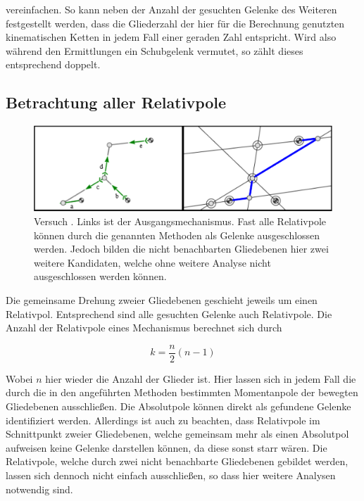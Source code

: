 vereinfachen.
So kann neben der Anzahl der gesuchten Gelenke des Weiteren festgestellt werden, dass die Gliederzahl der hier für die Berechnung genutzten kinematischen Ketten in jedem Fall einer geraden Zahl entspricht.
Wird also während den Ermittlungen ein Schubgelenk vermutet, so zählt dieses entsprechend doppelt.

\subsection{Betrachtung aller Relativpole}

\begin{figure}
    \includegraphics[width=\textwidth]{gfx/gruppe4_3_edit.png}
    \caption[Versuch ]{Versuch . Links ist der Ausgangsmechanismus. Fast alle Relativpole können durch die genannten Methoden als Gelenke ausgeschlossen werden. Jedoch bilden die nicht benachbarten Gliedebenen hier zwei weitere Kandidaten, welche ohne weitere Analyse nicht ausgeschlossen werden können.}
    \label{fig:gruppe4_3}
\end{figure}

Die gemeinsame Drehung zweier Gliedebenen geschieht jeweils um einen Relativpol.
Entsprechend sind alle gesuchten Gelenke auch Relativpole.
Die Anzahl der Relativpole eines Mechanismus berechnet sich durch~\cite{Goessner2016}

\begin{equation}
    k = \frac{n}{2}(n-1)
    \label{eq:anzahl_pole}
\end{equation}

Wobei $n$ hier wieder die Anzahl der Glieder ist.
Hier lassen sich in jedem Fall die durch die in den angeführten Methoden bestimmten Momentanpole der bewegten Gliedebenen ausschlie{\ss}en.
Die Absolutpole können direkt als gefundene Gelenke identifiziert werden.
Allerdings ist auch zu beachten, dass Relativpole im Schnittpunkt zweier Gliedebenen, welche gemeinsam mehr als einen Absolutpol aufweisen keine Gelenke darstellen können, da diese sonst starr wären.
Die Relativpole, welche durch zwei nicht benachbarte Gliedebenen gebildet werden, lassen sich dennoch nicht einfach ausschlie{\ss}en, so dass hier weitere Analysen notwendig sind.

